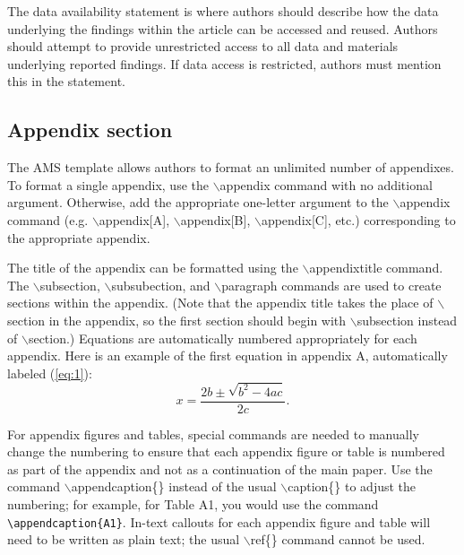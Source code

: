 \documentclass{ametsocV5}
\begin{document}
% 
%
\datastatement
The data availability statement is where authors should describe how the data underlying 
the findings within the article can be accessed and reused. Authors should attempt to 
provide unrestricted access to all data and materials underlying reported findings. 
If data access is restricted, authors must mention this in the statement.




 \appendix[A] 



\subsection*{Appendix section}

The AMS template allows authors to format an unlimited number of
appendixes. To format a single appendix, use the $\backslash$appendix
command with no additional argument. Otherwise, add the appropriate
one-letter argument to the $\backslash$appendix command (e.g.
$\backslash$appendix[A], $\backslash$appendix[B],
$\backslash$appendix[C], etc.) corresponding to the appropriate
appendix. 


The title of the appendix can be formatted using the
$\backslash$appendixtitle{\tt\string{\string}} 
 command. The $\backslash$subsection, $\backslash$subsubection,
and $\backslash$paragraph commands are used to create sections within
the appendix. (Note that the appendix title takes the place of $\backslash$section 
in the appendix, so the first section should begin with $\backslash$subsection
instead of $\backslash$section.)
 Equations are automatically numbered appropriately for 
each appendix. Here is an example of the first equation in appendix
A, automatically labeled (\ref{eq:1}): 
\begin{equation} \label{eq:1}
x=\frac{2b\pm\sqrt{b^{2}-4ac}}{2c}.  
\end{equation}

For appendix figures and tables, special commands are needed to manually 
change the numbering to ensure that each appendix figure or table is numbered 
as part of the appendix and not as a continuation of the main paper. Use the command
$\backslash$appendcaption\{\} instead of the usual $\backslash$caption\{\} to adjust the 
numbering; for example, for Table A1, you would use the command \verb+\appendcaption{A1}+.
In-text callouts for each appendix figure and table will need to be written as plain text;
the usual $\backslash$ref\{\} command cannot be used.
\end{document}
